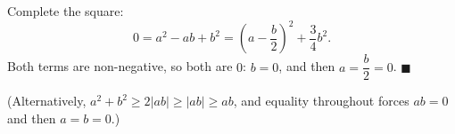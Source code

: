 Complete the square:
\[
0=a^2-ab+b^2=\left(a-\dfrac {b}{2}\right)^2+\dfrac{3}{4}b^2 .
\]
Both terms are non-negative, so both are $0$: $b=0$, and then $a=\dfrac {b}{2}=0$. $\blacksquare$

(Alternatively, $a^2+b^2\ge2|ab|\ge|ab|\ge ab$, and equality throughout forces $ab=0$ and then $a=b=0$.)
